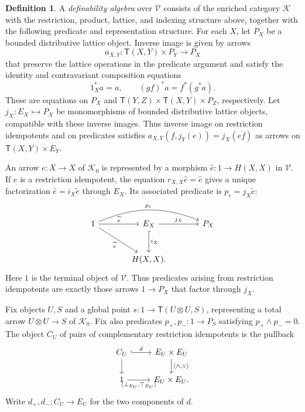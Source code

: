 \documentclass[11pt]{article}
\theoremstyle{definition}
\newtheorem{definition}[theorem]{Definition}
\theoremstyle{remark}
\begin{document}
\begin{definition}\label{def:generalized-definability-algebra}
A \emph{definability algebra} over $\mathscr V$ consists of the
enriched category $\mathcal K$ with the restriction, product,
lattice, and indexing structure above, together with the following
predicate and representation structure.
For each $X$, let $P_X$ be a bounded distributive lattice object.
Inverse image is given by arrows
\[
 a_{X,Y}:\mathsf T(X,Y)\times P_Y\longrightarrow P_X
\]
that preserve the lattice operations in the predicate argument and
satisfy the identity and contravariant composition equations
\[
 1_X^*a=a,\qquad (gf)^*a=f^*(g^*a).
\]
These are equations on $P_X$ and
$\mathsf T(Y,Z)\times \mathsf T(X,Y)\times P_Z$, respectively.
Let $j_X:E_X\rightarrowtail P_X$ be monomorphisms of bounded
distributive lattice objects, compatible with these inverse images.
Thus inverse image on restriction idempotents and on predicates satisfies
$a_{X,Y}(f,j_Y(e))=j_X(\overline{ef})$ as arrows on
$\mathsf T(X,Y)\times E_Y$.

An arrow $e:X\to X$ of $\mathcal K_0$ is represented
by a morphism $\widehat e:1\to H(X,X)$ in $\mathscr V$.
If $e$ is a restriction idempotent, the equation
$r_{X,X}\widehat e=\widehat e$ gives a unique factorization
$\widehat e=i_X\widetilde e$ through $E_X$.
Its associated predicate is $p_e=j_X\widetilde e$:
\[
\begin{tikzcd}[column sep=large,row sep=large]
 1 \arrow[r,"\widetilde e"] \arrow[dr,"\widehat e"']
   \arrow[rr,bend left=22,"p_e"]
 & E_X \arrow[r,"j_X"] \arrow[d,hook,"i_X"] & P_X \\
 & H(X,X). &
\end{tikzcd}
\]
Here $1$ is the terminal object of $\mathscr V$.
Thus predicates arising from restriction idempotents are exactly those arrows
$1\to P_X$ that factor through $j_X$.

Fix objects $U,S$ and a global point
$s:1\to \mathsf T(U\otimes U,S)$, representing a total arrow
$U\otimes U\to S$ of $\mathcal K_0$. Fix also predicates
$p_+,p_-:1\to P_S$ satisfying $p_+\wedge p_-=0$.
The object $C_U$ of pairs of complementary restriction idempotents is the pullback
\begin{equation}\label{eq:v8-complement-pullback}
\begin{tikzcd}
 C_U \arrow[r, hook, "d"] \arrow[d] & E_U\times E_U
 \arrow[d, "{\langle\wedge,\vee\rangle}"]\\
 1 \arrow[r, "{\langle\bot_{E_U},\top_{E_U}\rangle}"'] & E_U\times E_U.
\end{tikzcd}
\end{equation}
Write $d_+,d_-:C_U\to E_U$ for the two components of $d$.


\end{definition}
\end{document}
